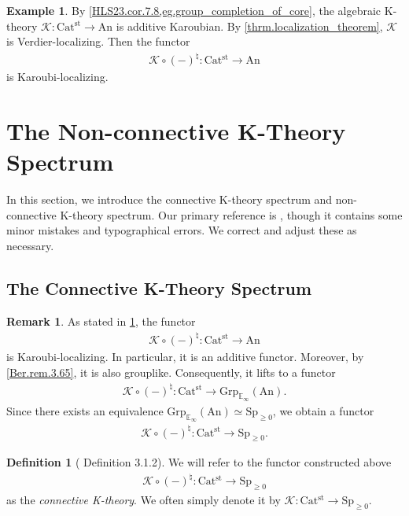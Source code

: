 \documentclass[a4paper,dvipdfmx,11pt,reqno]{amsart}
\newcommand{\K}{\mathcal{K}}
\newcommand{\An}{\mathrm{An}}
\newcommand{\Catst}{\mathrm{Cat^{st}}}
\newcommand{\Grp}{\mathrm{Grp}_{\mathbb{E}_{\infty}}}
\newcommand{\Sp}{\mathrm{Sp}}
\theoremstyle{definition}
\newtheorem{definition}[theorem]{Definition}
\newtheorem{example}[theorem]{Example}
\newtheorem{remark}[theorem]{Remark}
\begin{document}
\begin{example} \label{Ber.cor.5.52}
  By \cref{HLS23.cor.7.8,eg.group_completion_of_core}, the algebraic K-theory $\K : \Catst \to \An$ is additive Karoubian.
  By \cref{thrm.localization_theorem}, $\K$ is Verdier-localizing.
  Then the functor 
  \begin{align*}
    \K \circ (-)^{\natural} : \Catst \to \An
  \end{align*}
  is Karoubi-localizing.
\end{example}


\section{The Non-connective K-Theory Spectrum}

In this section, we introduce the connective K-theory spectrum and non-connective K-theory spectrum.
Our primary reference is \cite{KNP24}, though it contains some minor mistakes and typographical errors.
We correct and adjust these as necessary.

\subsection{The Connective K-Theory Spectrum}

\begin{remark}
  As stated in \cref{Ber.cor.5.52}, the functor 
  \begin{align*}
    \K \circ (-)^{\natural} : \Catst \to \An
  \end{align*}
  is Karoubi-localizing.
  In particular, it is an additive functor.
  Moreover, by \cref{Ber.rem.3.65}, it is also grouplike.
  Consequently, it lifts to a functor 
  \begin{align*}
    \K \circ (-)^{\natural} : \Catst \to \Grp(\An).
  \end{align*}
  Since there exists an equivalence $\Grp(\An) \simeq \Sp_{\geq 0}$, we obtain a functor 
  \begin{align*}
    \K \circ (-)^{\natural} : \Catst \to \Sp_{\geq 0}.
  \end{align*}
\end{remark}

\begin{definition}[\cite{KNP24} Definition 3.1.2] \label{KNP24.def.3.1.2}
  We will refer to the functor constructed above
  \begin{align*}
    \K \circ (-)^{\natural} : \Catst \to \Sp_{\geq 0}
  \end{align*}
  as the \textit{connective K-theory}.
  We often simply denote it by $\K : \Catst \to \Sp_{\geq 0}$.
\end{definition}
\end{document}
